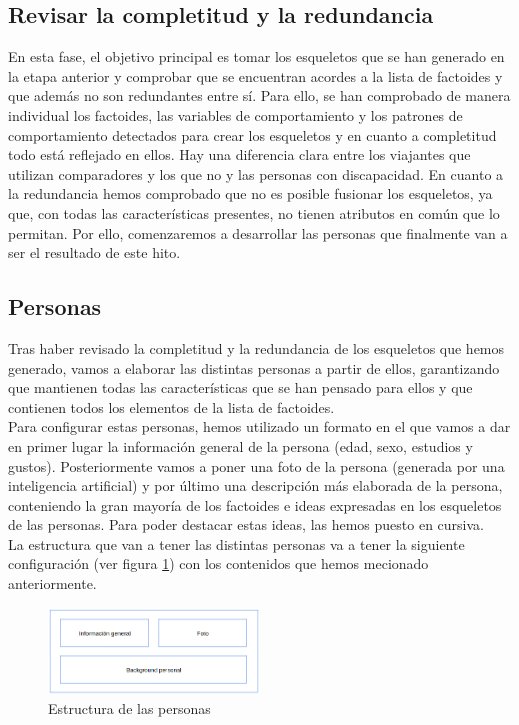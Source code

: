 \subsection{Revisar la completitud y la redundancia}
En esta fase, el objetivo principal es tomar los esqueletos que se han generado en la etapa anterior y comprobar que se encuentran acordes a la lista de factoides y que además no son redundantes entre sí. Para ello, se han comprobado de manera individual los factoides, las variables de comportamiento y los patrones de comportamiento detectados para crear los esqueletos y en cuanto a completitud todo está reflejado en ellos. 
Hay una diferencia clara entre los viajantes que utilizan comparadores y los que no y las personas con discapacidad. 
En cuanto a la redundancia hemos comprobado que no es posible fusionar los esqueletos, ya que, con todas las características presentes, no tienen atributos en común que lo permitan. Por ello, comenzaremos a desarrollar las personas que finalmente van a ser el resultado de este hito.

\subsection{Personas}
Tras haber revisado la completitud y la redundancia de los esqueletos que hemos generado, vamos a elaborar las distintas personas a partir de ellos, garantizando que mantienen todas las características que se han pensado para ellos y que contienen todos los elementos de la lista de factoides. \\

Para configurar estas personas, hemos utilizado un formato en el que vamos a dar en primer lugar la información general de la persona (edad, sexo, estudios y gustos). Posteriormente vamos a poner una foto de la persona (generada por una inteligencia artificial) y por último una descripción más elaborada de la persona, conteniendo la gran mayoría de los factoides e ideas expresadas en los esqueletos de las personas. Para poder destacar estas ideas, las hemos puesto en cursiva. \\

La estructura que van a tener las distintas personas va a tener la siguiente configuración (ver figura \ref{fig:estructura-personas}) con los contenidos que hemos mecionado anteriormente.
\begin{figure}[h]
    \centering
    \includegraphics[width=0.5\textwidth]{Imagenes/Personas/Plantilla personas.png}
    \caption{Estructura de las personas}
    \label{fig:estructura-personas}
\end{figure}

